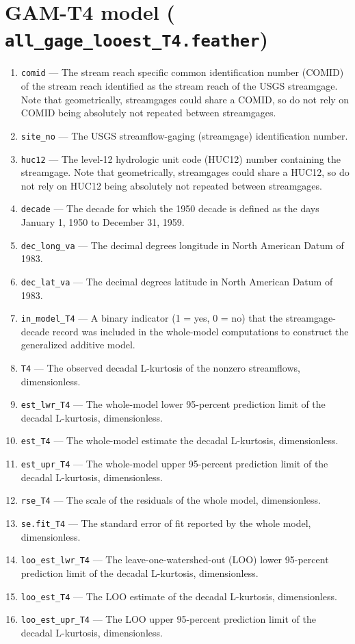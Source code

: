 \documentclass[1p, authoryear, 11pt, times, preprint]{elsarticle}
\newcommand{\code}[1]{{\color{black}%
                       \mbox{\lstinline[basicstyle={\small\ttfamily},
                                        keywordstyle=\scriptsize\ttfamily]|#1|}}}
\begin{document}
\section{GAM-T4 model (\code{all_gage_looest_T4.feather})}
\begin{enumerate}
\footnotesize
\RaggedRight
\item \code{comid} --- The stream reach specific common identification number (COMID) of the stream reach identified as the stream reach of the USGS streamgage. Note that geometrically, streamgages could share a COMID, so do not rely on COMID being absolutely not repeated between streamgages.
\item \code{site_no} --- The USGS streamflow-gaging (streamgage) identification number.
\item \code{huc12} --- The level-12 hydrologic unit code (HUC12) number containing the streamgage. Note that geometrically, streamgages could share a HUC12, so do not rely on HUC12 being absolutely not repeated between streamgages.
\item \code{decade} --- The decade for which the 1950 decade is defined as the days January 1, 1950 to December 31, 1959.
\item \code{dec_long_va} --- The decimal degrees longitude in North American Datum of 1983.
\item \code{dec_lat_va} --- The decimal degrees latitude in North American Datum of 1983.
\item \code{in_model_T4} --- A binary indicator (1 = yes, 0 = no) that the streamgage-decade record was included in the whole-model computations to construct the generalized additive model.
\item \code{T4} --- The observed decadal L-kurtosis of the nonzero streamflows, dimensionless.
\item \code{est_lwr_T4} --- The whole-model lower 95-percent prediction limit of the decadal L-kurtosis, dimensionless.
\item \code{est_T4} --- The whole-model estimate the decadal L-kurtosis, dimensionless.
\item \code{est_upr_T4} --- The whole-model upper 95-percent prediction limit of the decadal L-kurtosis, dimensionless.
\item \code{rse_T4} --- The scale of the residuals of the whole model, dimensionless.
\item \code{se.fit_T4} --- The standard error of fit reported by the whole model, dimensionless.
\item \code{loo_est_lwr_T4} --- The leave-one-watershed-out (LOO) lower 95-percent prediction limit of the decadal L-kurtosis, dimensionless.
\item \code{loo_est_T4} --- The LOO estimate of the decadal L-kurtosis, dimensionless.
\item \code{loo_est_upr_T4} --- The LOO upper 95-percent prediction limit of the decadal  L-kurtosis, dimensionless.
\end{enumerate}
\end{document}
